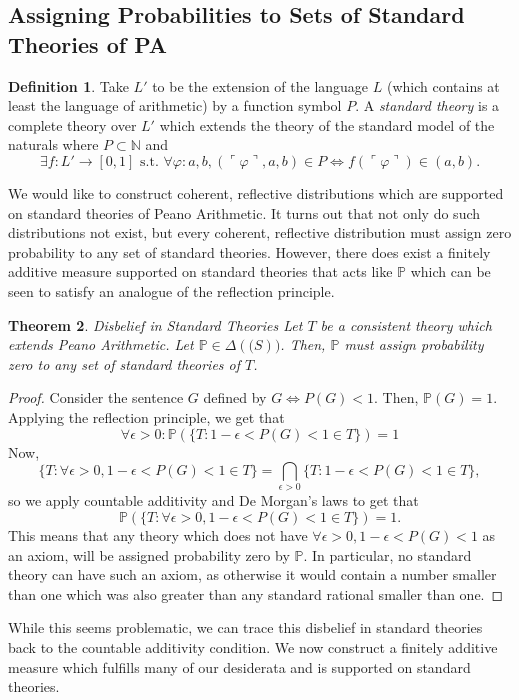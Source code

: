 \documentclass[12pt]{article}
\newcommand{\PP}{\mathbb{P}}
\newcommand{\vp}{\varphi}
\theoremstyle{plain}
\newtheorem{theorem}{Theorem}[subsection]
\theoremstyle{definition}
\newtheorem{definition}[theorem]{Definition}
\theoremstyle{remark}
\begin{document}
\subsection{Assigning Probabilities to Sets of Standard Theories of PA}
\begin{definition}
Take $L'$ to be the extension of the language $L$ (which contains at least the language of arithmetic) by a function symbol $P$. A \emph{standard theory} is a complete theory over $L'$ which extends the theory of the standard model of the naturals where $P\subset\mathbb{N}$ and 
$$\exists f : L'\rightarrow[0, 1] \text{ s.t. } \forall \vp: a, b, (\ulcorner \vp \urcorner, a, b) \in P \iff f(\ulcorner \vp \urcorner) \in (a, b).$$
\end{definition}
We would like to construct coherent, reflective distributions which are supported on standard theories of Peano Arithmetic. It turns out that not only do such distributions not exist, but every coherent, reflective distribution must assign zero probability to any set of standard theories. However, there does exist a finitely additive measure supported on standard theories that acts like $\PP$ which can be seen to satisfy an analogue of the reflection principle.
\begin{theorem} \emph{Disbelief in Standard Theories}
Let $T$ be a consistent theory which extends Peano Arithmetic.
Let $\PP\in\Delta(\mathcal(S))$.
Then, $\PP$ must assign probability zero to any set of standard theories of $T$.
\end{theorem}
\begin{proof}
Consider the sentence $G$ defined by $G \iff P(G) < 1$.
Then, $\PP(G)=1$.
Applying the reflection principle, we get that 
$$\forall\epsilon>0: \PP(\{T:1-\epsilon<P(G)<1\in T\})=1$$
Now, 
$$\{T:\forall \epsilon>0,1-\epsilon<P(G)<1\in T\}=\bigcap_{\epsilon>0}\{T:1-\epsilon<P(G)<1\in T\},$$ so we apply countable additivity and De Morgan's laws to get that $$\PP(\{T:\forall \epsilon>0,1-\epsilon<P(G)<1\in T\})=1.$$
This means that any theory which does not have $\forall \epsilon>0,1-\epsilon<P(G)<1$ as an axiom, will be assigned probability zero by $\PP$.
In particular, no standard theory can have such an axiom, as otherwise it would contain a number smaller than one which was also greater than any standard rational smaller than one.
\end{proof}
While this seems problematic, we can trace this disbelief in standard theories back to the countable additivity condition. We now construct a finitely additive measure which fulfills many of our desiderata and is supported on standard theories.
\end{document}

